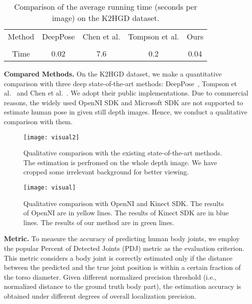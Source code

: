 \documentclass{sig-alternate-05-2015}
\begin{document}
\begin{table}[t]
\scriptsize
\center
\setlength{\tabcolsep}{2.5pt}
\begin{tabular}{|c|c|c|c|c|}
\hline
\hline
Method & DeepPose & Chen et al. & Tompson et al. & Ours  \\
& \cite{dp14cvpr} &\cite{idpr14nips}&\cite{cn15cvpr} & \\
\hline
Time & 0.02 & 7.6 & 0.2 & 0.04 \\
\hline
\hline
\end{tabular}
\vspace{1pt}
\caption{Comparison of the average running time (seconds per image) on the K2HGD dataset.}\label{tab:time}
\end{table}

\textbf{Compared Methods.}
On the K2HGD dataset, we make a quantitative comparison with three deep state-of-the-art methods: DeepPose~\cite{dp14cvpr}, Tompson et al.~\cite{cn15cvpr} and Chen et al.~\cite{idpr14nips}. We adopt their public implementations. Due to commercial reasons, the widely used OpenNI SDK and Microsoft SDK are not supported to estimate human pose in given still depth images. Hence, we conduct a qualitative comparison with them. 

\begin{figure*}[!htb]
\centering
\texttt{[image: visual2]}
\caption{Qualitative comparison with the existing state-of-the-art methods. The estimation is perfromed on the whole depth image. We have cropped some irrelevant background for better viewing.}\label{fig:visual2}
\end{figure*}

\begin{figure*}[!htb]
\centering
\texttt{[image: visual]}
\caption{Qualitative comparison with OpenNI and Kinect SDK. The results of OpenNI are in yellow lines. The results of Kinect SDK are in blue lines. The results of our method are in green lines.}\label{fig:visual}
\end{figure*}

\textbf{Metric.} To measure the accuracy of predicting human body joints, we employ the popular Percent of Detected Joints (PDJ) metric as the evaluation criterion. This metric considers a body joint is correctly estimated only if the distance between the predicted and the true joint position is within a certain fraction of the torso diameter. Given different normalized precision threshold (i.e., normalized distance to the ground truth body part), the estimation accuracy is obtained under different degrees of overall localization precision. 
\end{document}
